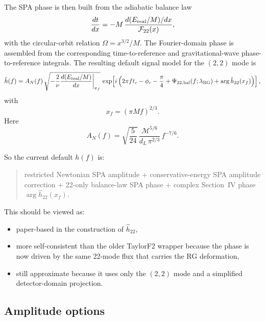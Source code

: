 \documentclass[11pt]{article}
\begin{document}
The SPA phase is then built from the adiabatic balance law
\begin{equation}
  \frac{dt}{dx}
  =
  -M\,
  \frac{d(E_{\rm real}/M)/dx}{\mathcal F_{22}(x)},
\end{equation}
with the circular-orbit relation \(\Omega=x^{3/2}/M\). The Fourier-domain
phase is assembled from the corresponding time-to-reference and
gravitational-wave phase-to-reference integrals. The resulting default signal
model for the \((2,2)\) mode is
\begin{equation}
  \tilde h(f)
  =
  A_N(f)\,
  \sqrt{
    -\frac{2}{\nu}\frac{d(E_{\rm real}/M)}{dx}\bigg|_{x_f}
  }\,
  \exp\!\left[
    i\left(
      2\pi f t_c - \phi_c - \frac{\pi}{4}
      + \Psi_{22,{\rm bal}}(f;\lambda_{\rm RG})
      + \arg \hat h_{22}(x_f)
    \right)
  \right],
\end{equation}
with
\begin{equation}
  x_f = (\pi M f)^{2/3}.
\end{equation}
Here
\begin{equation}
  A_N(f)
  =
  \sqrt{\frac{5}{24}}\,
  \frac{\mathcal M^{5/6}}{d_L\,\pi^{2/3}}\,
  f^{-7/6}.
\end{equation}

So the current default \(h(f)\) is:
\begin{quote}
restricted Newtonian SPA amplitude + conservative-energy SPA amplitude
correction + 22-only balance-law SPA phase + complex Section~IV phase
\(\arg\hat h_{22}(x_f)\).
\end{quote}

This should be viewed as:
\begin{itemize}
  \item paper-based in the construction of \(\hat h_{22}\),
  \item more self-consistent than the older TaylorF2 wrapper because the phase
  is now driven by the same 22-mode flux that carries the RG deformation,
  \item still approximate because it uses only the \((2,2)\) mode and a
  simplified detector-domain projection.
\end{itemize}

\subsection{Amplitude options}
\end{document}
